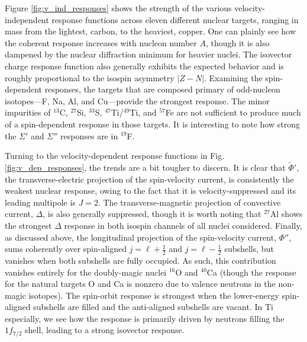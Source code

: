 \documentclass{book}[letterpaper,12pt]
\begin{document}
Figure \ref{fig:v_ind_responses} shows the strength of the various velocity-independent response functions across eleven different nuclear targets, ranging in mass from the lightest, carbon, to the heaviest, copper. One can plainly see how the coherent response increases with nucleon number $A$, though it is also dampened by the nuclear diffraction minimum for heavier nuclei. The isovector charge response function also generally exhibits the expected behavior and is roughly proportional to the isospin asymmetry $|Z-N|$. Examining the spin-dependent responses, the targets that are composed primary of odd-nucleon isotopes---F, Na, Al, and Cu---provide the strongest response. The minor impurities of $^{13}$C, $^{27}$Si, $^{33}$S, $^{47}$Ti/$^{49}$Ti, and $^{57}$Fe are not sufficient to produce much of a spin-dependent response in those targets. It is interesting to note how strong the $\Sigma'$ and $\Sigma''$ responses are in $^{19}$F.

Turning to the velocity-dependent response functions in Fig. \ref{fig:v_dep_responses}, the trends are a bit tougher to discern. It is clear that $\tilde{\Phi}'$, the transverse-electric projection of the spin-velocity current, is consistently the weakest nuclear response, owing to the fact that it is velocity-suppressed and its leading multipole is $J=2$. The transverse-magnetic projection of convective current, $\Delta$, is also generally suppressed, though it is worth noting that $^{27}$Al shows the strongest $\Delta$ response in both isospin channels of all nuclei considered. Finally, as discussed above, the longitudinal projection of the spin-velocity current, $\Phi''$, sums coherently over spin-aligned $j=\ell+\frac{1}{2}$ and $j=\ell-\frac{1}{2}$ subshells, but vanishes when both subshells are fully occupied. As such, this contribution vanishes entirely for the doubly-magic nuclei $^{16}$O and $^{40}$Ca (though the response for the natural targets O and Ca is nonzero due to valence neutrons in the non-magic isotopes). The spin-orbit response is strongest when the lower-energy spin-aligned subshells are filled and the anti-aligned subshells are vacant. In Ti especially, we see how the response is primarily driven by neutrons filling the $1f_{7/2}$ shell, leading to a strong isovector response.
\end{document}
